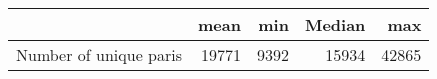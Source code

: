 \begin{tabular}{lrrrr}
\toprule
{} &   mean &   min &  Median &    max \\
\midrule
Number of unique paris &  19771 &  9392 &   15934 &  42865 \\
\bottomrule
\end{tabular}

